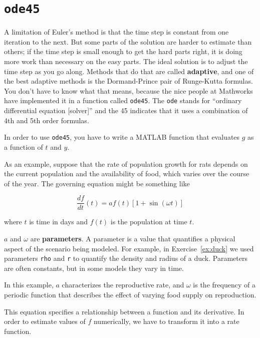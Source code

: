 \documentclass[
]{book}
\begin{document}
\section{{\tt ode45}}
\label{sect:ode45}

A limitation of Euler's method is that the time step is constant from
one iteration to the next.  But some parts of the solution are
harder to estimate than others; if the time step is small enough to
get the hard parts right, it is doing more work than necessary on the
easy parts.  The ideal solution is to adjust the time step as you go
along.  Methods that do that are called {\bf adaptive}, and one of the
best adaptive methods is the Dormand-Prince pair of Runge-Kutta
formulas.  You don't have to know what that means,
because the nice people at Mathworks have implemented it in a function
called {\tt ode45}.  The {\tt ode} stands for ``ordinary differential
equation [solver]'' and the 45 indicates that it uses a combination of
4th and 5th order formulas.

In order to use {\tt ode45}, you have to write a MATLAB function
that evaluates $g$ as a function of
$t$ and $y$.


As an example, suppose that the rate of population growth for rats
depends on the current population and the availability of food,
which varies over the course of the year.
The governing equation might be something like

\begin{equation}
\frac{df}{dt}(t) = a f(t) \left[1 + \sin (\omega t) \right]
\end{equation}

%
where $t$ is time in days and $f(t)$ is the population at time $t$.

$a$ and $\omega$ are {\bf parameters}.  A parameter is a value that
quantifies a physical aspect of the scenario being modeled.  For
example, in Exercise~\ref{ex:duck} we used parameters {\tt rho} and
{\tt r} to quantify the density and radius of a duck.  Parameters are
often constants, but in some models they vary in time.

In this example, $a$ characterizes the reproductive rate, and
$\omega$ is the frequency of a periodic function that describes
the effect of varying food supply on reproduction.

This equation specifies a relationship between a
function and its derivative.  In order to estimate values of
$f$ numerically, we have to transform it into a rate function.
\end{document}
